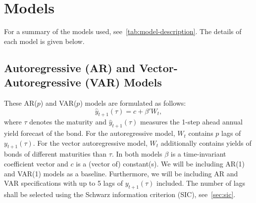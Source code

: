 \section{Models}
\label{sec:models}
For a summary of the models used, see~\cref{tab:model-description}. The details of each model is given below.
\subsection{Autoregressive (AR) and Vector-Autoregressive (VAR) Models}
\label{sec:arvar}
These AR($p$) and VAR($p$) models are formulated as follows:
\begin{equation}
	\hat{y}_{t+1}(\tau) = c + \beta' W_t,
\end{equation}
where $\tau$ denotes the maturity and $\hat{y}_{t+1}(\tau)$ measures the 1-step ahead annual yield forecast of the bond. 
For the autoregressive model, $W_t$ contains $p$ lags of $y_{t+1}(\tau)$. For the vector autoregressive model, $W_t$ additionally contains yields of bonds of different maturities than $\tau$. 
In both models $\beta$ is a time-invariant coefficient vector and $c$ is a (vector of) constant(s). 
We will be including AR(1) and VAR(1) models as a baseline. 
Furthermore, we will be including AR and VAR specifications with up to 5 lags of $y_{t+1}(\tau)$ included. 
The number of lags shall be selected using the Schwarz information criterion (SIC), see~\cref{sec:sic}.


